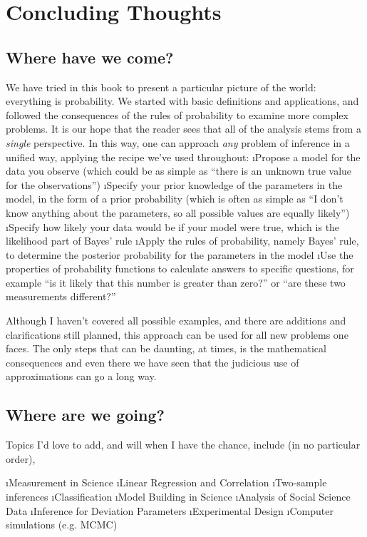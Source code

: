 \chapter{Concluding Thoughts}\label{ch:conclusions}

\section{Where have we come?}

We have tried in this book to present a particular picture of the world: everything is probability.  We started with basic definitions and applications, and followed the consequences of the rules of probability to examine more complex problems.  It is our hope that the reader sees that all of the analysis stems from a \emph{single} perspective.  In this way, one can approach \emph{any} problem of inference in a unified way, applying the  recipe we've used throughout:
\be
\i Propose a model for the data you observe (which could be as simple as ``there is an unknown true value for the observations'')
\i Specify your prior knowledge of the parameters in the model, in the form of a prior probability (which is often as simple as ``I don't know anything about the parameters, so all possible values are equally likely'')
\i Specify how likely your data would be if your model were true, which is the likelihood part of Bayes' rule
\i Apply the rules of probability, namely Bayes' rule, to determine the posterior probability for the parameters in the model
\i Use the properties of probability functions to calculate answers to specific questions, for example ``is it likely that this number is greater than zero?'' or ``are these two measurements different?''
\ee

Although I haven't covered all possible examples, and there are additions and clarifications still planned, this approach can be used for all new problems one faces.  The only steps that can be daunting, at times, is the mathematical consequences and even there we have seen that the judicious use of approximations can go a long way.

\section{Where are we going?}

Topics I'd love to add, and will when I have the chance, include (in no particular order),

\bi
\i Measurement in Science
\i Linear Regression and Correlation
\i Two-sample inferences
\i Classification
\i Model Building in Science
\i Analysis of Social Science Data
\i Inference for Deviation Parameters
\i Experimental Design
\i Computer simulations (e.g. MCMC)
\ei
